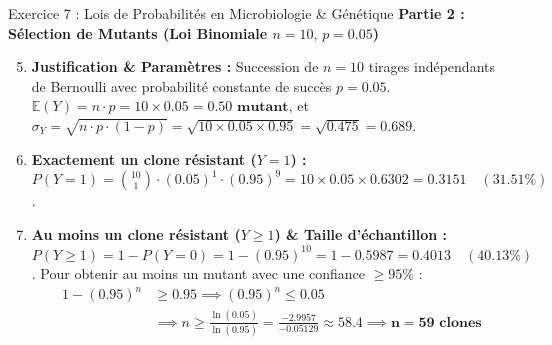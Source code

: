 \documentclass[11pt,a4paper]{article}
\begin{document}
\begin{solutionbox}{Exercice 7 : Lois de Probabilités en Microbiologie \& Génétique}
\textbf{Partie 2 : Sélection de Mutants (Loi Binomiale $n=10, \, p=0.05$)}
\begin{enumerate}[label=\textbf{\alph*.}]
  \setcounter{enumi}{4}
  \item \textbf{Justification \& Paramètres :} Succession de $n = 10$ tirages indépendants de Bernoulli avec probabilité constante de succès $p = 0.05$.
  $\mathbb{E}(Y) = n \cdot p = 10 \times 0.05 = \mathbf{0.50 \text{ mutant}}$, et $\sigma_Y = \sqrt{n \cdot p \cdot (1-p)} = \sqrt{10 \times 0.05 \times 0.95} = \sqrt{0.475} = \mathbf{0.689}$.
  \item \textbf{Exactement un clone résistant ($Y = 1$) :}
  $P(Y = 1) = \binom{10}{1} \cdot (0.05)^1 \cdot (0.95)^9 = 10 \times 0.05 \times 0.6302 = \mathbf{0.3151 \quad (31.51\%)}$.
  \item \textbf{Au moins un clone résistant ($Y \ge 1$) \& Taille d'échantillon :}
  $P(Y \ge 1) = 1 - P(Y = 0) = 1 - (0.95)^{10} = 1 - 0.5987 = \mathbf{0.4013 \quad (40.13\%)}$.
  Pour obtenir au moins un mutant avec une confiance $\ge 95\%$ :
  \begin{align*}
    1 - (0.95)^n &\ge 0.95 \implies (0.95)^n \le 0.05 \\
    &\implies n \ge \frac{\ln(0.05)}{\ln(0.95)} = \frac{-2.9957}{-0.05129} \approx 58.4 \implies \mathbf{n = 59 \text{ clones}}
  \end{align*}
\end{enumerate}
\end{solutionbox}
\end{document}
